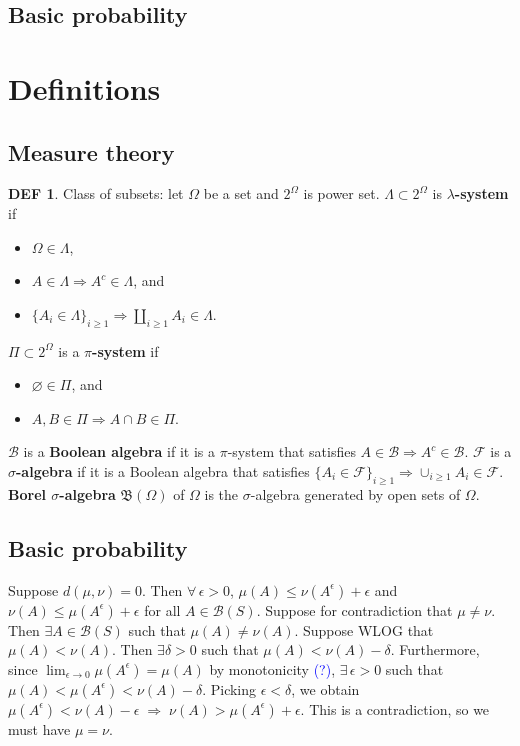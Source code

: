 \documentclass[hidelinks,11pt]{article}
\theoremstyle{definition}
\newtheorem{defin}{DEF}
\theoremstyle{dotless}
\theoremstyle{named}
\theoremstyle{remark}
\DeclareMathOperator{\1}{\mathbf{1}}
\begin{document}
\subsection{Basic probability}

\newpage\section{Definitions}

\subsection{Measure theory}

\begin{defin}
Class of subsets: let $\Omega$ be a set and $2^\Omega$ is power set.\newline
$\Lambda\subset2^\Omega$ is \textbf{$\lambda$-system} if\begin{itemize}
    \item $\Omega\in\Lambda$,
    \item $A\in\Lambda\Rightarrow A^c\in\Lambda$, and
    \item $\{A_i\in\Lambda\}_{i\geq1}\Rightarrow\amalg_{i\geq1}A_i\in\Lambda$.
\end{itemize}
$\Pi\subset2^\Omega$ is a \textbf{$\pi$-system} if\begin{itemize}
    \item $\varnothing\in\Pi$, and
    \item $A,B\in\Pi\Rightarrow A\cap B\in\Pi$.
\end{itemize}
$\mathcal{B}$ is a \textbf{Boolean algebra} if it is a $\pi$-system that satisfies $A\in\mathcal{B}\Rightarrow A^c\in\mathcal{B}$.\newline
$\mathcal{F}$ is a \textbf{$\sigma$-algebra} if it is a Boolean algebra that satisfies $\{A_i\in\mathcal{F}\}_{i\geq1}\Rightarrow\cup_{i\geq1}A_i\in\mathcal{F}$.\newline
\textbf{Borel $\sigma$-algebra} $\mathfrak{B}(\Omega)$ of $\Omega$ is the $\sigma$-algebra generated by open sets of $\Omega$.
\end{defin}

\subsection{Basic probability}

Suppose $d(\mu, \nu) = 0$. Then $\forall \, \epsilon > 0$, $\mu(A) \leq \nu(A^\epsilon) + \epsilon$ and $\nu(A) \leq \mu(A^\epsilon) + \epsilon$ for all $A \in \mathcal{B}(S)$. Suppose for contradiction that $\mu \neq \nu$. Then $\exists A \in \mathcal{B}(S)$ such that $\mu(A) \neq \nu(A)$. Suppose WLOG that $\mu(A) < \nu(A)$. Then $\exists \delta > 0$ such that $\mu(A) < \nu(A) - \delta$. Furthermore, since $\lim_{\epsilon \rightarrow 0} \mu(A^\epsilon) = \mu(A)$ by monotonicity \textcolor{blue}{(?)}, $\exists \, \epsilon > 0$ such that $\mu(A) < \mu(A^\epsilon) < \nu(A) - \delta$. Picking $\epsilon < \delta$, we obtain $\mu(A^\epsilon) < \nu(A) - \epsilon \; \Rightarrow \; \nu(A) > \mu(A^\epsilon) + \epsilon $. This is a contradiction, so we must have $\mu = \nu$. \\\\
\end{document}
